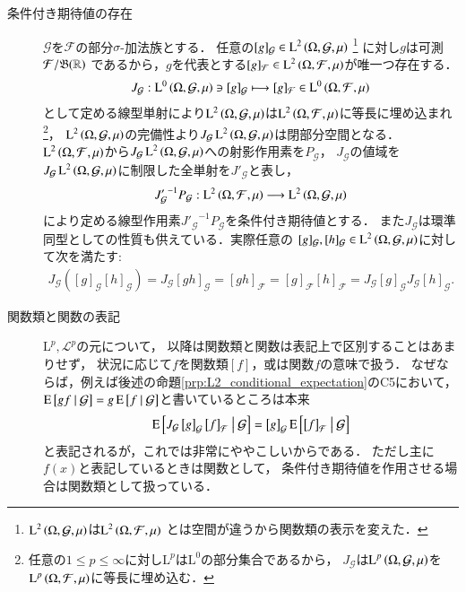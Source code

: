 \begin{description}
	\item[条件付き期待値の存在]
		$\mathcal{G}$を$\mathcal{F}$の部分$\sigma$-加法族とする．
		任意の$[g]_{\mathcal{G}} \in \operatorname{L}^{2} \left(\Omega, \mathcal{G},\mu\right)$
		\footnote{
			$\operatorname{L}^{2} \left(\Omega, \mathcal{G},\mu\right)$は$\operatorname{L}^{2} \left(\Omega, \mathcal{F},\mu\right)$
			とは空間が違うから関数類の表示を変えた．
		}
		に対し$g$は可測$\mathcal{F}/\mathfrak{B}(\mathbb{R})$
		であるから，$g$を代表とする$[g]_{\mathcal{F}} \in \operatorname{L}^{2} \left(\Omega, \mathcal{F},\mu\right)$が唯一つ存在する．
		\begin{align}
			J_{\mathcal{G}}:\operatorname{L}^{0} \left(\Omega, \mathcal{G},\mu\right) \ni [g]_{\mathcal{G}} \longmapsto [g]_{\mathcal{F}} \in \operatorname{L}^{0} \left(\Omega, \mathcal{F},\mu\right)
			\label{eq:Lp_sp_embedding}
		\end{align}
		として定める線型単射により$\operatorname{L}^{2} \left(\Omega, \mathcal{G},\mu\right)$は$\operatorname{L}^{2} \left(\Omega, \mathcal{F},\mu\right)$に等長に埋め込まれ
		\footnote{
			任意の$1 \leq p \leq \infty$に対し$\mathrm{L}^{p}$は$\mathrm{L}^{0}$の部分集合であるから，
			$J_{\mathcal{G}}$は$\operatorname{L}^{p} \left(\Omega, \mathcal{G},\mu\right)$を$\operatorname{L}^{p} \left(\Omega, \mathcal{F},\mu\right)$に等長に埋め込む．
		}，
		$\operatorname{L}^{2} \left(\Omega, \mathcal{G},\mu\right)$の完備性より$J_{\mathcal{G}} \operatorname{L}^{2} \left(\Omega, \mathcal{G},\mu\right)$は閉部分空間となる．
		$\operatorname{L}^{2} \left(\Omega, \mathcal{F},\mu\right)$から$J_{\mathcal{G}} \operatorname{L}^{2} \left(\Omega, \mathcal{G},\mu\right)$への射影作用素を$P_\mathcal{G}$，
		$J_{\mathcal{G}}$の値域を$J_{\mathcal{G}} \operatorname{L}^{2} \left(\Omega, \mathcal{G},\mu\right)$に制限した全単射を$J'_{\mathcal{G}}$と表し，
		\begin{align}
			{J'_{\mathcal{G}}}^{-1} P_{\mathcal{G}}:\operatorname{L}^{2} \left(\Omega, \mathcal{F},\mu\right) \longrightarrow \operatorname{L}^{2} \left(\Omega, \mathcal{G},\mu\right)
			\label{eq:composition_L2_conditional_expectation}
		\end{align}
		により定める線型作用素${J'_{\mathcal{G}}}^{-1} P_{\mathcal{G}}$を条件付き期待値とする．
		また$J_{\mathcal{G}}$は環準同型としての性質も供えている．実際任意の
		$[g]_{\mathcal{G}}, [h]_{\mathcal{G}} \in \operatorname{L}^{2} \left(\Omega, \mathcal{G},\mu\right)$に対して次を満たす:
		\begin{align}
			J_{\mathcal{G}}\left( [g]_{\mathcal{G}} [h]_{\mathcal{G}} \right)
			= J_{\mathcal{G}} [g h]_{\mathcal{G}}
			= [g h]_{\mathcal{F}}
			= [g]_{\mathcal{F}} [h]_{\mathcal{F}}
			= J_{\mathcal{G}} [g]_{\mathcal{G}} J_{\mathcal{G}} [h]_{\mathcal{G}}.
		\end{align}
		
	\item[関数類と関数の表記]
		$\mathrm{L}^p,\mathscr{L}^p$の元について，
		以降は関数類と関数は表記上で区別することはあまりせず，
		状況に応じて$f$を関数類$[f]$，或は関数$f$の意味で扱う．
		なぜならば，例えば後述の命題\ref{prp:L2_conditional_expectation}のC5において，
		$\operatorname{E} \left[ gf \ \middle|\ \mathcal{G} \right] = g\operatorname{E} \left[ f \ \middle|\ \mathcal{G} \right]$と書いているところは本来
		\begin{align}
			\operatorname{E} \left[ J_{\mathcal{G}}\left[g\right]_{\mathcal{G}}\left[f\right]_{\mathcal{F}} \ \middle|\ \mathcal{G} \right] 
			= \left[g\right]_{\mathcal{G}}\operatorname{E} \left[ \left[f\right]_{\mathcal{F}} \ \middle|\ \mathcal{G} \right]
		\end{align}
		と表記されるが，これでは非常にややこしいからである．
		ただし主に$f(x)$と表記しているときは関数として，
		条件付き期待値を作用させる場合は関数類として扱っている．
	\end{description}
	
